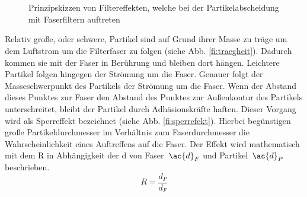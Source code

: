 \begin{figure}[ht!]
    \begin{center}
%
       \\ %
       \\%

%
   \end{center}
   \caption{%
       Prinzipskizzen von Filtereffekten, welche bei der Partikelabscheidung mit Faserfiltern auftreten
    }%
  \label{fig:filtereffekte}
\end{figure}
Relativ große, oder schwere, Partikel sind auf Grund ihrer Masse zu träge um dem Luftstrom um die Filterfaser zu folgen (siehe Abb. \ref{fi:traegheit}). Dadurch kommen sie mit der Faser in Berührung und bleiben dort hängen. 
Leichtere Partikel folgen hingegen der Strömung um die Faser. Genauer folgt der Masseschwerpunkt des Partikels der Strömung um die Faser. Wenn der Abstand dieses Punktes zur Faser den Abstand des Punktes zur Außenkontur des Partikels unterschreitet, bleibt der Partikel durch Adhäsionskräfte haften. Dieser Vorgang wird als Sperreffekt bezeichnet (siehe Abb. \ref{fi:sperrefekt}). Hierbei begünstigen große Partikeldurchmesser im Verhältnis zum Faserdurchmesser die Wahrscheinlichkeit eines Auftreffens auf die Faser. Der Effekt wird mathematisch mit dem \ac{R} in Abhängigkeit der \ac{d} von Faser~$\ac{d}_{F}$ und Partikel~$\ac{d}_{P}$ beschrieben. \cite{vdi3677_2} 
\[
R = \frac{d_P}{d_F}
\]

